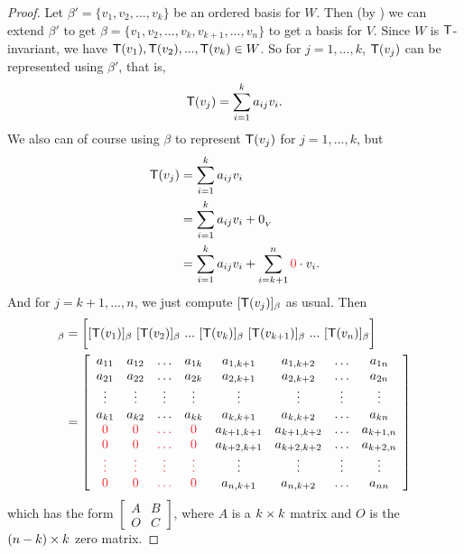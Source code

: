 \begin{proof}
Let \(\beta' = \{ v_1, v_2, ..., v_k \}\) be an ordered basis for \(W\).
Then (by ) we can extend \(\beta'\) to get \(\beta = \{ v_1, v_2, ..., v_k, v_{k + 1}, ..., v_n \}\) to get a basis for \(V\).
Since \(W\) is \(\textsf{T}\)-invariant, we have \(\textsf{T}(v_1), \textsf{T}(v_2), ..., \textsf{T}(v_k) \in W\).
So for \(j = 1, ..., k\), \(\textsf{T}(v_j)\) can be represented using \(\beta'\), that is,
\[
    \textsf{T}(v_j) = \sum_{i = 1}^k a_{ij} v_i.
\]
We also can of course using \(\beta\) to represent \(\textsf{T}(v_j)\) for \(j = 1, ..., k\), but
\begin{align*}
    \T(v_j) & = \sum_{i = 1}^k a_{ij} v_i \\
            & = \sum_{i = 1}^k a_{ij} v_i + \OV \\
            & = \sum_{i = 1}^k a_{ij} v_i + \sum_{i = k + 1}^n \RED{0} \cdot v_i.
\end{align*}
And for \(j = k + 1, ..., n\), we just compute \([\textsf{T}(v_j)]_{\beta}\) as usual.
Then
\begin{align*}
    [\T]_{\beta} & = \bigg[ [\T(v_1)]_{\beta} \ [\T(v_2)]_{\beta}\ ...\ [\T(v_k)]_{\beta}\ [\T(v_{k + 1})]_{\beta}\ ...\ [\T(v_n)]_{\beta} \bigg] \\
                 & =
    \left[\begin{array}{cccccccc}
        a_{11} & a_{12} & \ldots & a_{1k} & a_{1,k+1} & a_{1,k+2} & \ldots & a_{1n} \\
        a_{21} & a_{22} & \ldots & a_{2k} & a_{2,k+1} & a_{2,k+2} & \ldots & a_{2n} \\
        \vdots & \vdots & \vdots & \vdots & \vdots & \vdots & \vdots & \vdots \\
        a_{k 1} & a_{k 2} & \ldots & a_{kk} & a_{k,k+1} & a_{k,k+2} & \ldots & a_{kn} \\
        \RED{0} & \RED{0} & \RED{\ldots} & \RED{0} & a_{k+1,k+1} & a_{k+1,k+2} & \ldots & a_{k+1,n} \\
        \RED{0} & \RED{0} & \RED{\ldots} & \RED{0} & a_{k+2,k+1} & a_{k+2,k+2} & \ldots & a_{k+2,n} \\
        \RED{\vdots} & \RED{\vdots} & \RED{\vdots} & \RED{\vdots} & \vdots & \vdots & \vdots & \vdots \\
        \RED{0} & \RED{0} & \RED{\ldots} & \RED{0} & a_{n,k+1} & a_{n,k+2} & \ldots & a_{nn}
    \end{array}\right]
\end{align*}
which has the form
\(\left[\begin{array}{cc}
    A & B \\
    O & C
\end{array}\right]\), where \(A\) is a \(k \times k\) matrix and \(O\) is the \((n - k) \times k\) zero matrix.
\end{proof}

